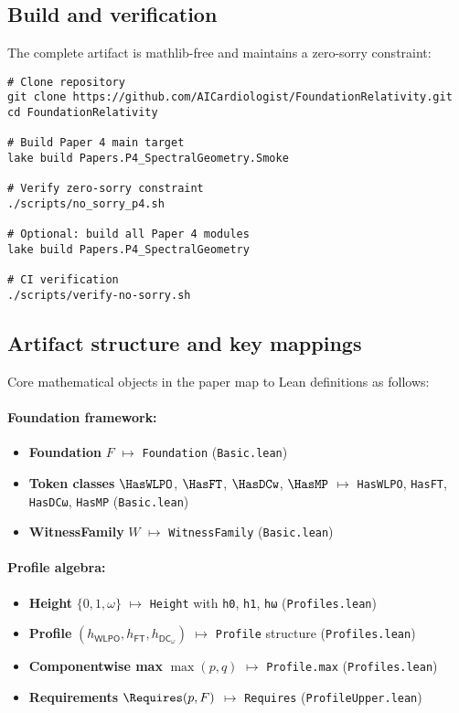\documentclass[11pt]{article}
\newcommand{\WLPO}{\mathsf{WLPO}}
\newcommand{\FT}{\mathsf{FT}}
\newcommand{\DCw}{\mathsf{DC}_{\omega}}
\newcommand{\lean}[1]{\texttt{#1}}
\theoremstyle{plain}
\theoremstyle{definition}
\theoremstyle{remark}
\begin{document}
\subsection{Build and verification}
The complete artifact is mathlib-free and maintains a zero-sorry constraint:

\begin{verbatim}
# Clone repository
git clone https://github.com/AICardiologist/FoundationRelativity.git
cd FoundationRelativity

# Build Paper 4 main target
lake build Papers.P4_SpectralGeometry.Smoke

# Verify zero-sorry constraint
./scripts/no_sorry_p4.sh

# Optional: build all Paper 4 modules
lake build Papers.P4_SpectralGeometry

# CI verification
./scripts/verify-no-sorry.sh
\end{verbatim}

\subsection{Artifact structure and key mappings}
Core mathematical objects in the paper map to Lean definitions as follows:

\paragraph{Foundation framework:}
\begin{itemize}
\item \textbf{Foundation} $F$ $\mapsto$ \lean{Foundation} (\texttt{Basic.lean})
\item \textbf{Token classes} $\HasWLPO$, $\HasFT$, $\HasDCw$, $\HasMP$ $\mapsto$ \lean{HasWLPO}, \lean{HasFT}, \lean{HasDCω}, \lean{HasMP} (\texttt{Basic.lean})
\item \textbf{WitnessFamily} $W$ $\mapsto$ \lean{WitnessFamily} (\texttt{Basic.lean})
\end{itemize}

\paragraph{Profile algebra:}
\begin{itemize}
\item \textbf{Height} $\{0,1,\omega\}$ $\mapsto$ \lean{Height} with \lean{h0}, \lean{h1}, \lean{hω} (\texttt{Profiles.lean})
\item \textbf{Profile} $(h_{\WLPO}, h_{\FT}, h_{\DCw})$ $\mapsto$ \lean{Profile} structure (\texttt{Profiles.lean})
\item \textbf{Componentwise max} $\max(p,q)$ $\mapsto$ \lean{Profile.max} (\texttt{Profiles.lean})
\item \textbf{Requirements} $\Requires(p,F)$ $\mapsto$ \lean{Requires} (\texttt{ProfileUpper.lean})
\end{itemize}
\end{document}
